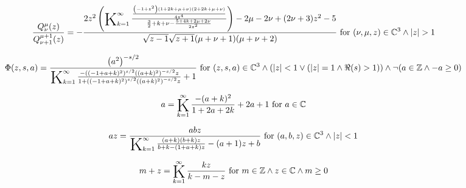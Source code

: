 \documentclass{article}
\newcommand{\bigK}{\mathop{\raisebox{-5pt}{\huge K}}}
\begin{document}
\[\frac{Q_{\nu }^{\mu }(z)}{Q_{\nu +1}^{\mu +1}(z)}=-\frac{2 z^2 \left(\bigK_{k=1}^{\infty}\frac{\frac{\left(-1+z^2\right) (1+2 k+\mu +\nu ) (2+2 k+\mu +\nu )}{4 z^4}}{\frac{3}{2}+k+\nu -\frac{5+4 k+2 \mu +2 \nu }{2 z^2}}\right)-2 \mu -2 \nu +(2 \nu +3) z^2-5}{\sqrt{z-1} \sqrt{z+1} (\mu +\nu +1) (\mu +\nu +2)}\text{ for }(\nu ,\mu ,z)\in \mathbb{C}^3\land \left| z\right| >1\] 

\[\Phi (z,s,a)=\frac{\left(a^2\right)^{-s/2}}{\bigK_{k=1}^{\infty}\frac{-\left((-1+a+k)^2\right)^{s/2} \left((a+k)^2\right)^{-s/2} z}{1+\left((-1+a+k)^2\right)^{s/2} \left((a+k)^2\right)^{-s/2} z}+1}\text{ for }(z,s,a)\in \mathbb{C}^3\land (\left| z\right| <1\lor (\left| z\right| =1\land \Re(s)>1))\land \neg (a\in \mathbb{Z}\land -a\geq 0)\] 

\[a=\bigK_{k=1}^{\infty}\frac{-(a+k)^2}{1+2 a+2 k}+2 a+1\text{ for }a\in \mathbb{C}\] 

\[a z=\frac{a b z}{\bigK_{k=1}^{\infty}\frac{(a+k) (b+k) z}{b+k-(1+a+k) z}-(a+1) z+b}\text{ for }(a,b,z)\in \mathbb{C}^3\land \left| z\right| <1\] 

\[m+z=\bigK_{k=1}^{\infty}\frac{k z}{k-m-z}\text{ for }m\in \mathbb{Z}\land z\in \mathbb{C}\land m\geq 0\] 
\end{document}
